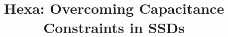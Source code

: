 \documentclass[conference]{IEEEtran}
\begin{document}
\title{Hexa: Overcoming Capacitance Constraints in SSDs}


\author{
}
\end{document}
